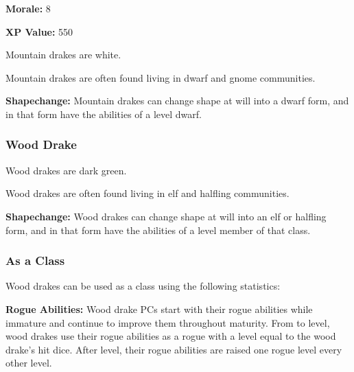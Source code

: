 \begin{multicols*}{2}
{\textbf{Morale:} 8

\textbf{XP Value:} 550}

Mountain drakes are white.

Mountain drakes are often found living in dwarf and gnome communities.

\textbf{Shapechange:} Mountain drakes can change shape at will into a dwarf form, and in that form have the abilities of a  level dwarf.

\subsubsection{Wood Drake}

Wood drakes are dark green.

Wood drakes are often found living in elf and halfling communities.

\textbf{Shapechange:} Wood drakes can change shape at will into an elf or halfling form, and in that form have the abilities of a  level member of that class.

\subsubsection{As a Class}
Wood drakes can be used as a class using the following statistics:

\textbf{Rogue Abilities:} Wood drake PCs start with their rogue abilities while immature and continue to improve them throughout maturity. From  to  level, wood drakes use their rogue abilities as a rogue with a level equal to the wood drake's hit dice. After  level, their rogue abilities are raised one rogue level every other level.


\end{multicols*}
